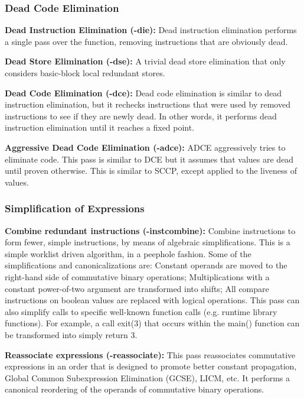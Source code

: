 \subsubsection{Dead Code Elimination}

\noindent\textbf{Dead Instruction Elimination ({\flagstype -die}):}
Dead instruction elimination performs a single pass over the function, removing instructions that are obviously dead.

\noindent\textbf{Dead Store Elimination ({\flagstype -dse}):}
A trivial dead store elimination that only considers basic-block local redundant stores.

\noindent\textbf{Dead Code Elimination ({\flagstype -dce}):}
Dead code elimination is similar to dead instruction elimination, but it rechecks instructions that were used by removed instructions to see if they are newly dead.
In other words, it performs dead instruction elimination until it reaches a fixed point.

\noindent\textbf{Aggressive Dead Code Elimination ({\flagstype -adce}):}
ADCE aggressively tries to eliminate code.
This pass is similar to DCE but it assumes that values are dead until proven otherwise.
This is similar to SCCP, except applied to the liveness of values.

\subsubsection{Simplification of Expressions}

\noindent\textbf{Combine redundant instructions ({\flagstype -instcombine}):}
Combine instructions to form fewer, simple instructions, by means of algebraic simplifications.
This is a simple worklist driven algorithm, in a peephole fashion.
Some of the simplifications and canonicalizations are:
Constant operands are moved to the right-hand side of commutative binary operations;
Multiplications with a constant power-of-two argument are transformed into shifts;
All compare instructions on boolean values are replaced with logical operations.
This pass can also simplify calls to specific well-known function calls (e.g. runtime library functions).
For example, a call exit(3) that occurs within the main() function can be transformed into simply return 3.

\noindent\textbf{Reassociate expressions ({\flagstype -reassociate}):}
This pass reassociates commutative expressions in an order that is designed to promote better constant propagation, Global Common Subexpression Elimination (GCSE), LICM, etc.
It performs a canonical reordering of the operands of commutative binary operations.


